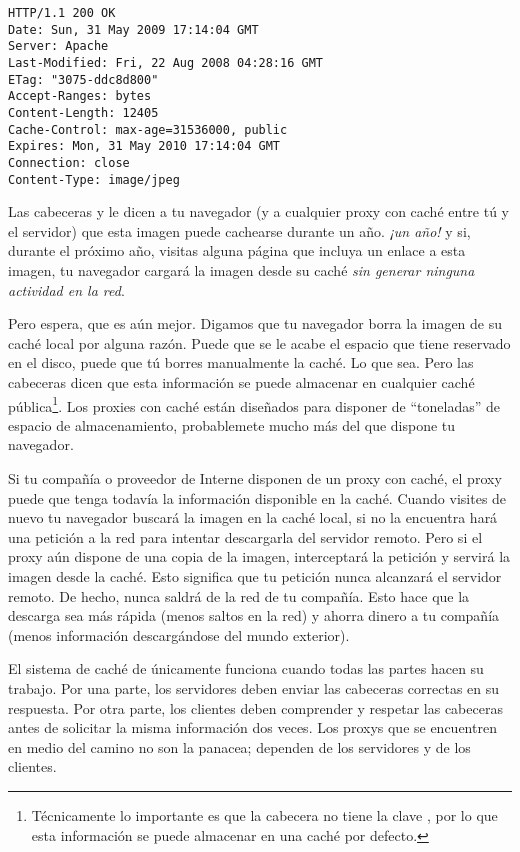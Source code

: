 \noindent\begin{minipage}{\textwidth}
\begin{lstlisting}[mathescape=True]
HTTP/1.1 200 OK
Date: Sun, 31 May 2009 17:14:04 GMT
Server: Apache
Last-Modified: Fri, 22 Aug 2008 04:28:16 GMT
ETag: "3075-ddc8d800"
Accept-Ranges: bytes
Content-Length: 12405
Cache-Control: max-age=31536000, public
Expires: Mon, 31 May 2010 17:14:04 GMT
Connection: close
Content-Type: image/jpeg
\end{lstlisting}
\end{minipage}

Las cabeceras  y  le dicen a tu navegador (y a cualquier proxy con caché entre tú y el servidor) que esta imagen puede cachearse durante un año. \emph{¡un año!} y si, durante el próximo año, visitas alguna página que incluya un enlace a esta imagen, tu navegador cargará la imagen desde su caché \emph{sin generar ninguna actividad en la red}.

Pero espera, que es aún mejor. Digamos que tu navegador borra la imagen de su caché local por alguna razón. Puede que se le acabe el espacio que tiene reservado en el disco, puede que tú borres manualmente la caché. Lo que sea. Pero las cabeceras  dicen que esta información se puede almacenar en cualquier caché pública\footnote{Técnicamente lo importante es que la cabecera  no tiene la clave , por lo que esta información se puede almacenar en una caché por defecto.}. Los proxies con caché están diseñados para disponer de ``toneladas'' de espacio de almacenamiento, probablemete mucho más del que dispone tu navegador.

Si tu compañía o proveedor de Interne disponen de un proxy con caché, el proxy puede que tenga todavía la información disponible en la caché. Cuando visites de nuevo  tu navegador buscará la imagen en la caché local, si no la encuentra hará una petición a la red para intentar descargarla del servidor remoto. Pero si el proxy aún dispone de una copia de la imagen, interceptará la petición y servirá la imagen desde la caché. Esto significa que tu petición nunca alcanzará el servidor remoto. De hecho, nunca saldrá de la red de tu compañía. Esto hace que la descarga sea más rápida (menos saltos en la red) y ahorra dinero a tu compañía (menos información descargándose del mundo exterior).

El sistema de caché de  únicamente funciona cuando todas las partes hacen su trabajo. Por una parte, los servidores deben enviar las cabeceras correctas en su respuesta. Por otra parte, los clientes deben comprender y respetar las cabeceras antes de solicitar la misma información dos veces. Los proxys que se encuentren en medio del camino no son la panacea; dependen de los servidores y de los clientes.

